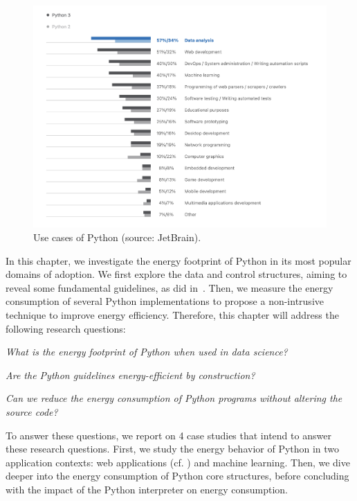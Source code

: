 \begin{figure}[hbt]
    \centering
    \includegraphics[width=\linewidth]{imgs/python_use_cases}
    \caption{Use cases of Python (source: JetBrain).}
    \label{fig:usecase}
\end{figure}

In this chapter, we investigate the energy footprint of Python in its most popular domains of adoption.
We first explore the data and control structures, aiming to reveal some fundamental guidelines, as \citeauthor{hasan_energy_2016} did in~\cite{hasan_energy_2016}.
Then, we measure the energy consumption of several Python implementations to propose a non-intrusive technique to improve energy efficiency.
Therefore, this chapter will address the following research questions:
\begin{compactenum}[\indent\bf RQ\,1:]
    \item \emph{What is the energy footprint of Python when used in data science?}
    \item \emph{Are the Python guidelines energy-efficient by construction?}
    \item \emph{Can we reduce the energy consumption of Python programs without altering the source code?}
\end{compactenum}

To answer these questions, we report on 4 case studies that intend to answer these research questions.
First, we study the energy behavior of Python in two application contexts: web applications (cf. ) and machine learning.
Then, we dive deeper into the energy consumption of Python core structures, before concluding with the impact of the Python interpreter on energy consumption.

